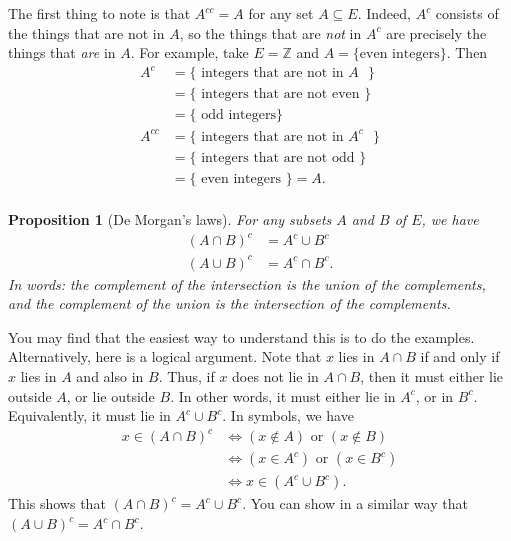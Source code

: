 \documentclass[a4paper]{book}
\newcommand{\RED}[1]{{\color{red}#1}}
\newcommand{\Z}         {{\mathbb{Z}}}
\newcommand{\iffa}      {\Leftrightarrow}
\newcommand{\sse}       {\subseteq}
\renewcommand{\:}{\colon}
\newcommand{\EMPH}[1]{\RED{\emph{#1}}}
\newtheorem{proposition}[theorem]{Proposition}
\theoremstyle{definition}
\begin{document}
The first thing to note is that $A^{cc}=A$ for any set $A\sse E$.
Indeed, $A^c$ consists of the things that are not in $A$, so the
things that are \EMPH{not} in $A^c$ are precisely the things that
\EMPH{are} in $A$.  For example, take $E=\Z$ and 
$A=\{\text{even integers}\}$.  Then
\begin{align*}
 A^c &= \{\text{ integers that are not in $A$ } \} \\
     &= \{\text{ integers that are not even } \} \\
     &= \{\text{ odd integers}\} \\
 A^{cc} &= \{\text{ integers that are not in $A^c$ } \} \\
        &= \{\text{ integers that are not odd } \} \\
        &= \{\text{ even integers }\} = A.\\
\end{align*}

\begin{proposition}[De Morgan's laws]
 For any subsets $A$ and $B$ of $E$, we have
 \begin{align*}
  (A\cap B)^c &= A^c\cup B^c \\
  (A\cup B)^c &= A^c\cap B^c.
 \end{align*}
 In words: the complement of the intersection is the union of the
 complements, and the complement of the union is the intersection of
 the complements.
\end{proposition}
You may find that the easiest way to understand this is to do the
examples.  Alternatively, here is a logical argument.  Note that $x$
lies in $A\cap B$ if and only if $x$ lies in $A$ and also in $B$.
Thus, if $x$ does not lie in $A\cap B$, then it must either lie
outside $A$, or lie outside $B$.  In other words, it must either lie
in $A^c$, or in $B^c$.  Equivalently, it must lie in $A^c\cup B^c$.
In symbols, we have
\begin{align*}
 x\in(A\cap B)^c &\iffa (x\not\in A) \text{ or } (x\not\in B) \\
                 &\iffa (x\in A^c) \text{ or } (x\in B^c) \\
                 &\iffa x\in (A^c\cup B^c).
\end{align*}
This shows that $(A\cap B)^c=A^c\cup B^c$.  You can show in a similar
way that $(A\cup B)^c=A^c\cap B^c$.
\end{document}
